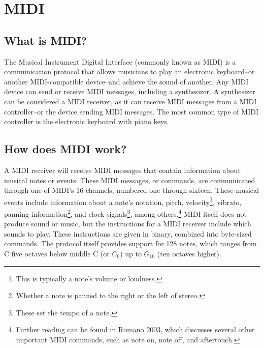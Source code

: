 \section[MIDI: An Introduction]{MIDI}\label{midi}

\subsection[What is MIDI?]{What is MIDI?}\label{what-midi}

The Musical Instrument Digital Interface (commonly known as MIDI) is a communication protocol that allows musicians to play an electronic keyboard--or another MIDI-compatible device--and achieve the sound of another. Any MIDI device can send or receive MIDI messages, including a synthesizer. A synthesizer can be considered a MIDI receiver, as it can receive MIDI messages from a MIDI controller--or the device sending MIDI messages. The most common type of MIDI controller is the electronic keyboard with piano keys.

\subsection[How does MIDI work?]{How does MIDI work?}\label{how-midi}

A MIDI receiver will receive MIDI messages that contain information about musical notes or events. These MIDI messages, or commands, are communicated through one of MIDI's 16 channels, numbered one through sixteen. These musical events include information about a note's notation, pitch, velocity\footnote{This is typically a note's volume or loudness.}, vibrato, panning information\footnote{Whether a note is panned to the right or the left of stereo.}, and clock signals\footnote{These set the tempo of a note.}, among others.\footnote{Further reading can be found in Romano 2003, which discusses several other important MIDI commands, such as note on, note off, and aftertouch.} MIDI itself does not produce sound or music, but the instructions for a MIDI receiver include which sounds to play. These instructions are given in binary, combined into byte-sized commands. The protocol itself provides support for 128 notes, which ranges from C five octaves below middle C (or $C_0$) up to $G_{10}$ (ten octaves higher).